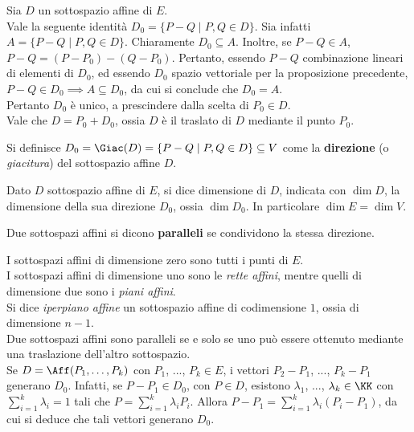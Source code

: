 \documentclass[11pt]{article}
\begin{document}
	\begin{remark}Sia $D$ un sottospazio affine di $E$. \\

		\li Vale la seguente identità $D_0 = \{ P - Q \mid P, Q \in D \}$. Sia infatti $A = \{ P - Q \mid P, Q \in D \}$. Chiaramente $D_0 \subseteq A$.
		Inoltre, se $P-Q \in A$, $P-Q = (P-P_0) - (Q-P_0)$. Pertanto, essendo $P-Q$ combinazione lineari di elementi
		di $D_0$, ed essendo $D_0$ spazio vettoriale per la proposizione precedente, $P-Q \in D_0 \implies A \subseteq D_0$, da cui si conclude che $D_0 = A$. \\
		\li Pertanto $D_0$ è unico, a prescindere dalla scelta di $P_0 \in D$. \\
		\li Vale che $D = P_0 + D_0$, ossia $D$ è il traslato di $D$ mediante il punto $P_0$.
	\end{remark}
	
	\begin{definition} 
		Si definisce $D_0 = \Giac(D) = \{ P - Q \mid P, Q \in D \} \subseteq V$ come la \textbf{direzione} (o \textit{giacitura}) del sottospazio affine $D$.
	\end{definition}

	\begin{definition} 
		Dato $D$ sottospazio affine di $E$, si dice dimensione di $D$,
		indicata con $\dim D$, la dimensione della sua direzione $D_0$, ossia
		$\dim D_0$. In particolare $\dim E = \dim V$.
	\end{definition}
	
	\begin{definition} 
		Due sottospazi affini si dicono \textbf{paralleli} se condividono
		la stessa direzione.
	\end{definition}

	\begin{remark}\nl
		\li I sottospazi affini di dimensione zero sono tutti i punti di $E$. \\
		\li I sottospazi affini di dimensione uno sono le \textit{rette affini},
		mentre quelli di dimensione due sono i \textit{piani affini}. \\
		\li Si dice \textit{iperpiano affine} un sottospazio affine di codimensione $1$,
		ossia di dimensione $n-1$. \\
		\li Due sottospazi affini sono paralleli se e solo se uno può
		essere ottenuto mediante una traslazione dell'altro sottospazio. \\
		\li Se $D = \Aff(P_1, \ldots, P_k)$ con $P_1$, ..., $P_k \in E$,
		i vettori $P_2 - P_1$, ..., $P_k - P_1$ generano $D_0$. Infatti,
		se $P - P_1 \in D_0$, con $P \in D$, esistono $\lambda_1$, ...,
		$\lambda_k \in \KK$ con $\sum_{i=1}^k \lambda_i = 1$ tali che
		$P = \sum_{i=1}^k \lambda_i P_i$. Allora $P-P_1 = \sum_{i=1}^k \lambda_i (P_i - P_1)$, da cui si deduce che tali vettori
		generano $D_0$.
	\end{remark}
	
\end{document}
